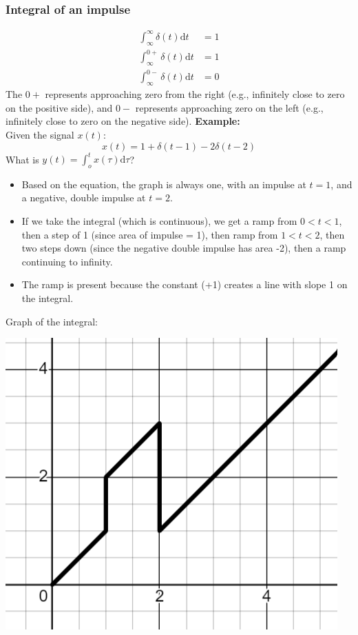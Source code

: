 \documentclass[10pt]{article}
\newcommand{\example}{\textbf{Example: }}
\begin{document}
\subsubsection*{Integral of an impulse}
\begin{align*}
    \int_{\infty}^\infty \delta(t) \text{d}t &= 1\\
    \int_{\infty}^{0+} \delta(t) \text{d}t &= 1\\
    \int_{\infty}^{0-} \delta(t) \text{d}t &= 0
\end{align*}
The $0+$ represents approaching zero from the right (e.g., infinitely close to zero on the positive side), and $0-$ represents approaching zero on the left (e.g., infinitely close to zero on the negative side).
\example\\
Given the signal $x(t)$:
\[x(t) = 1 + \delta(t - 1) - 2\delta(t - 2)\]
What is $y(t) = \int_o^t x(\tau) \text{d}\tau$?
\begin{itemize}
    \item Based on the equation, the graph is always one, with an impulse at $t = 1$, and a negative, double impulse at $t = 2$.
    \item If we take the integral (which is continuous), we get a ramp from $0 < t < 1$, then a step of 1 (since area of impulse = 1), then ramp from $1 < t < 2$, then two steps down (since the negative double impulse has area -2), then a ramp continuing to infinity.
    \item The ramp is present because the constant (+1) creates a line with slope 1 on the integral.
\end{itemize}
Graph of the integral:
\begin{center}
    \includegraphics[scale=0.8]{W2_8.png}
\end{center}
\pagebreak
\end{document}
